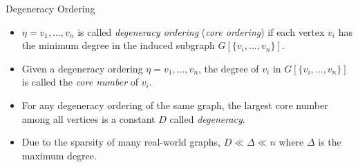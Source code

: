 \documentclass[9pt]{beamer} %
\begin{document}
\begin{frame}{Degeneracy Ordering}
    \begin{itemize}
        \item $\eta =v_1,. . .,v_n$ is called \emph{degeneracy ordering} (\emph{core ordering}) if each vertex $v_i$ has the minimum degree in the induced subgraph $G[\{v_i,...,v_n\}]$.
        \item Given a degeneracy ordering $\eta =v_1,. . .,v_n$, the degree of $v_i$ in $G[\{v_i,...,v_n\}]$ is called the \emph{core number} of $v_i$. 
        \item For any degeneracy ordering of the same graph, the largest core number among all vertices is a constant $D$ called \emph{degeneracy}.
        \item Due to the sparsity of many real-world graphs, $D \ll \Delta \ll n$ where $\Delta$ is the maximum degree.
    \end{itemize}
    \begin{figure}
\end{figure}
\end{frame}
\end{document}
